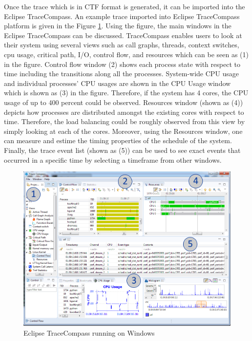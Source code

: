\begin{itemize}
	Once the trace which is in CTF format is generated, it can be imported into the Eclipse TraceCompass. An example trace imported into Eclipse TraceCompass platform is given in the Figure \ref{fig:tracecompass}. Using the figure, the main windows in the Eclipse TraceCompass can be discussed. TraceCompass enables users to look at their system using several views such as call graphs, threads, context switches, cpu usage, critical path, I/O, control flow, and resources which can be seen as (1) in the figure. Control flow window (2) shows each process state with respect to time including the transitions along all the processes. System-wide CPU usage and individual processes' CPU usages are shown in the CPU Usage window which is shown as (3) in the figure. Therefore, if the system has 4 cores, the CPU usage of up to 400 percent could be observed. Resources window (shown as (4)) depicts how processes are distributed amongst the existing cores with respect to time. Therefore, the load balancing could be roughly observed from this view by simply looking at each of the cores. Moreover, using the Resources window, one can measure and estime the timing properties of the schedule of the system. Finally, the trace event list (shown as (5)) can be used to see exact events that occurred in a specific time by selecting a timeframe from other windows.
	\begin{figure}[!ht]
		\centering
		\captionsetup{justification=centering}
		\includegraphics[scale=0.45]{content/images/tracecompass.png}
		\caption{Eclipse TraceCompass running on Windows}
		\label{fig:tracecompass}
	\end{figure}
\end{itemize}

